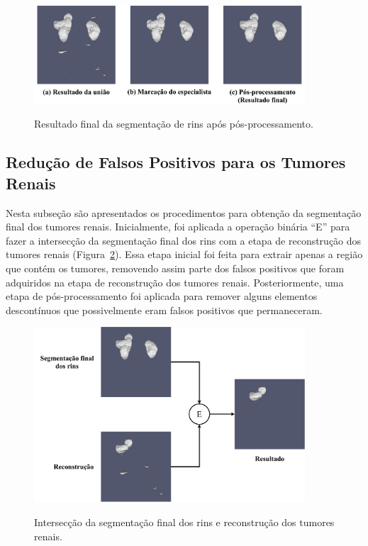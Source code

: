 \begin{figure}[!ht]
    \centering
    \caption{Resultado final da segmentação de rins após pós-processamento.}
    \includegraphics[width=0.9\textwidth]{figuras/rim-final.pdf}
    \label{fig:seg-final-rins}
\end{figure}

\subsection{Redução de Falsos Positivos para os Tumores Renais}
\label{sec:metodo-reducao-falsos-positivos-tumores-renais}

Nesta subseção são apresentados os procedimentos para obtenção da segmentação final dos tumores renais. Inicialmente, foi aplicada a operação binária “E” para fazer a intersecção da segmentação final dos rins com a etapa de reconstrução dos tumores renais (Figura~\ref{fig:interseccao-rins-recons}). Essa etapa inicial foi feita para extrair apenas a região que contém os tumores, removendo assim parte dos falsos positivos que foram adquiridos na etapa de reconstrução dos tumores renais. Posteriormente, uma etapa de pós-processamento foi aplicada para remover alguns elementos descontínuos que possivelmente eram falsos positivos que permaneceram.

\begin{figure}[!ht]
    \centering
    \caption{Intersecção da segmentação final dos rins e reconstrução dos tumores renais.}
    \includegraphics[width=0.9\textwidth]{figuras/interseccao-rim-reconstrucao.pdf}
    \label{fig:interseccao-rins-recons}
\end{figure}


